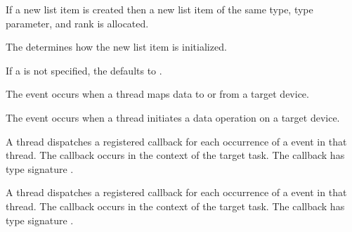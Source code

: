 \begin{fortranspecific}
If a new list item is created then a new list item of the same type, type parameter, and
rank is allocated.
\end{fortranspecific}

The  determines how the new list item is initialized.

If a  is not specified, the  defaults to .

\events
The  event occurs when a thread maps data to or from a target device.

The  event occurs when a thread initiates a data operation on a target device.

\tools

A thread dispatches a registered 
callback for each occurrence of a  event in that thread.
The callback occurs in the context of the target task.  The callback has type signature
.

A thread dispatches a registered 
callback for each occurrence of a  event in that thread.
The callback occurs in the context of the target task.  The callback has type signature
.

